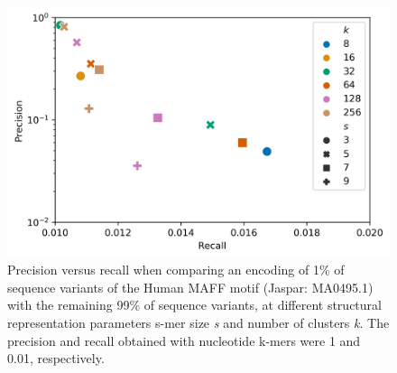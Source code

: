 \documentclass[sigconf]{acmart}
\begin{document}
\begin{figure}[ht]
  \centering
  \includegraphics[width=\linewidth]{smer_fig_prc.png}
  \caption{Precision versus recall when comparing an encoding of 1\% of sequence variants of the Human MAFF motif (Jaspar: MA0495.1) with the remaining 99\% of sequence variants, at different structural representation parameters s-mer size \textit{s} and number of clusters \textit{k}. The precision and recall obtained with nucleotide k-mers were 1 and 0.01, respectively.}
\end{figure}
\end{document}
